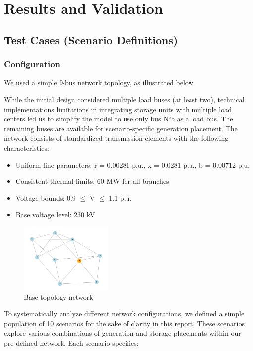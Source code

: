 \newpage
\section{Results and Validation}
\label{sec:results}

\subsection{Test Cases (Scenario Definitions)}
\label{sec:testcases_scenarios}

\subsubsection{Configuration}
We used a simple 9-bus network topology, as illustrated below. 

While the initial design considered multiple load buses (at least two), technical implementations limitations in 
integrating storage units with multiple load centers led us to simplify the model to use only bus N°5 as a load bus. 
The remaining buses are available for scenario-specific generation placement. The network consists of 
standardized transmission elements with the following characteristics:
\begin{itemize}
    \item Uniform line parameters: r = 0.00281 p.u., x = 0.0281 p.u., b = 0.00712 p.u.
    \item Consistent thermal limits: 60 MW for all branches
    \item Voltage bounds: 0.9 $\leq$ V $\leq$ 1.1 p.u.
    \item Base voltage level: 230 kV
\end{itemize}

\begin{figure}[h]
    \centering
    \includegraphics[width=0.4\textwidth]{images/network.png}
    \caption{Base topology network}
    \label{fig:base_network}
\end{figure}

To systematically analyze different network configurations, we defined a simple population of 10 
scenarios for the sake of clarity in this report. These scenarios explore various combinations of generation 
and storage placements within our pre-defined network. Each scenario specifies:

